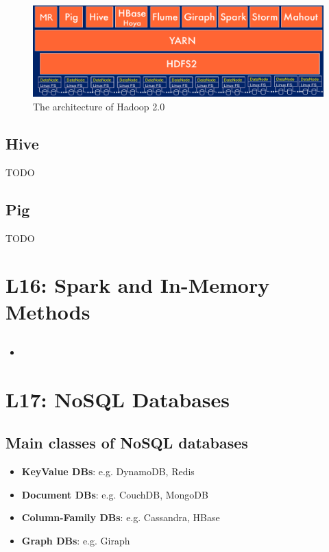 \documentclass[a4paper]{article}
\begin{document}
\begin{multicols}{3}
\begin{figure}[H]
    \includegraphics[width=\linewidth]{HadoopV2.png}
    \caption{The architecture of Hadoop 2.0}
    \label{fig:hadoopv2}
\end{figure}

\subsection{Hive}
TODO

\subsection{Pig}
TODO

\section{L16: Spark and In-Memory Methods}

\subsection{}
\begin{itemize}
    \item 
\end{itemize}

\section{L17: NoSQL Databases}

\subsection{Main classes of NoSQL databases}
\begin{itemize}
    \item \textbf{KeyValue DBs}: e.g. DynamoDB, Redis
    \item \textbf{Document DBs}: e.g. CouchDB, MongoDB
    \item \textbf{Column-Family DBs}: e.g. Cassandra, HBase
    \item \textbf{Graph DBs}: e.g. Giraph
\end{itemize}


\end{multicols}
\end{document}
